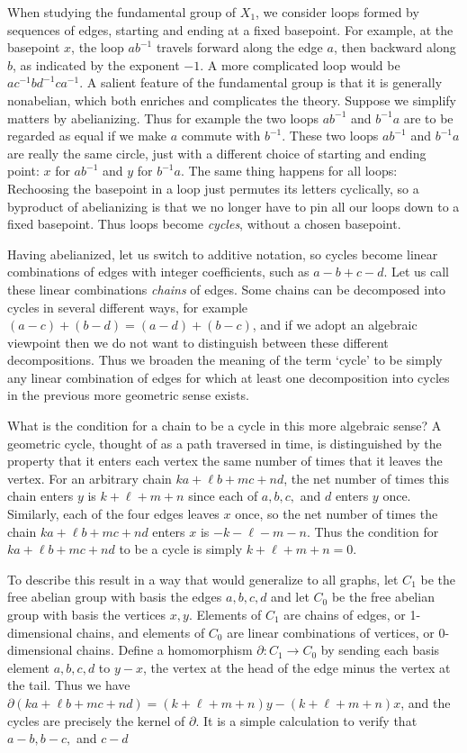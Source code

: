 When studying the fundamental group of $X_1$, we consider loops formed by sequences of edges, starting and ending at a fixed basepoint. For example, at the basepoint $x$, the loop $ab^{-1}$ travels forward along the edge $a$, then backward along $b$, as indicated by the exponent $-1$. A more complicated loop would be $ac^{-1}bd^{-1}ca^{-1}$. A salient feature of the fundamental group is that it is generally nonabelian, which both enriches and complicates the theory. Suppose we simplify matters by abelianizing. Thus for example the two loops $ab^{-1}$ and $b^{-1}a$ are to be regarded as equal if we make $a$ commute with $b^{-1}$. These two loops $ab^{-1}$ and $b^{-1}a$ are really the same circle, just with a different choice of starting and ending point: $x$ for $ab^{-1}$ and $y$ for $b^{-1}a$. The same thing happens for all loops: Rechoosing the basepoint in a loop just permutes its letters cyclically, so a byproduct of abelianizing is that we no longer have to pin all our loops down to a fixed basepoint. Thus loops become \emph{cycles}, without a chosen basepoint.

Having abelianized, let us switch to additive notation, so cycles become linear combinations of edges with integer coefficients, such as $a - b + c - d$. Let us call these linear combinations \emph{chains} of edges. Some chains can be decomposed into cycles in several different ways, for example $(a - c) + (b - d) = (a - d) + (b - c)$, and if we adopt an algebraic viewpoint then we do not want to distinguish between these different decompositions. Thus we broaden the meaning of the term `cycle' to be simply any linear combination of edges for which at least one decomposition into cycles in the previous more geometric sense exists.

What is the condition for a chain to be a cycle in this more algebraic sense? A geometric cycle, thought of as a path traversed in time, is distinguished by the property that it enters each vertex the same number of times that it leaves the vertex. For an arbitrary chain $ka + \ell b + mc + nd$, the net number of times this chain enters $y$ is $k + \ell + m + n$ since each of $a, b, c,$ and $d$ enters $y$ once. Similarly, each of the four edges leaves $x$ once, so the net number of times the chain $ka + \ell b + mc + nd$ enters $x$ is $-k - \ell - m - n$. Thus the condition for $ka + \ell b + mc + nd$ to be a cycle is simply $k + \ell + m + n = 0$.

To describe this result in a way that would generalize to all graphs, let $C_1$ be the free abelian group with basis the edges $a, b, c, d$ and let $C_0$ be the free abelian group with basis the vertices $x, y$. Elements of $C_1$ are chains of edges, or 1-dimensional chains, and elements of $C_0$ are linear combinations of vertices, or 0-dimensional chains. Define a homomorphism $\partial: C_1 \to C_0$ by sending each basis element $a, b, c, d$ to $y - x$, the vertex at the head of the edge minus the vertex at the tail. Thus we have $\partial(ka + \ell b + mc + nd) = (k + \ell + m + n)y - (k + \ell + m + n)x$, and the cycles are precisely the kernel of $\partial$. It is a simple calculation to verify that $a - b, b - c,$ and $c - d$

